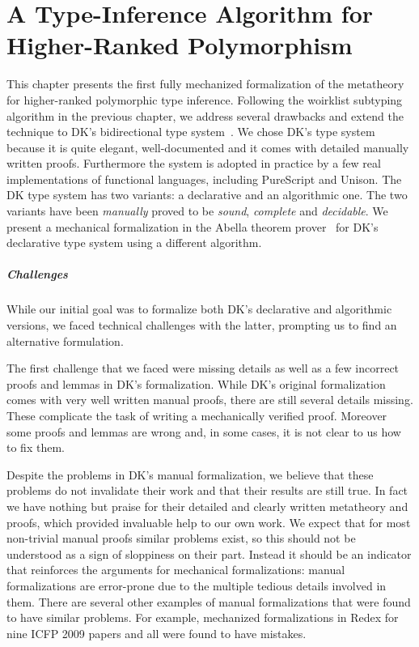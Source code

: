 \chapter{A Type-Inference Algorithm for Higher-Ranked Polymorphism}
\label{chap:ICFP}

This chapter presents the first fully mechanized formalization of the
metatheory for higher-ranked polymorphic type inference.
Following the woirklist subtyping algorithm in the previous chapter,
we address several drawbacks and extend the technique to
DK's bidirectional type system~\citep{dunfield2013complete}.
We chose DK's type system because it is
quite elegant, well-documented and it comes with detailed manually
written proofs. Furthermore the system is adopted in practice by a few
real implementations of functional languages, including PureScript and
Unison. The DK type system has two variants: a declarative
and an algorithmic one. The two variants have been
\emph{manually} proved to be \emph{sound}, \emph{complete} and
\emph{decidable}.
We present a mechanical formalization in the Abella theorem prover~\citep{AbellaDesc} for
DK's declarative type system using a different algorithm.

\paragraph{Challenges}
While our initial goal was to formalize both DK's declarative and algorithmic
versions, we faced technical challenges with the latter, prompting us to find
an alternative formulation.

The first challenge that we faced were missing details as well as
a few incorrect proofs and lemmas in DK's formalization. While DK's
original formalization comes with very well written manual proofs,
there are still several details missing. These complicate the task of
writing a mechanically verified proof. Moreover some proofs and
lemmas are wrong and, in some cases, it is not clear to us how to fix them.

Despite the problems in DK's manual formalization,
we believe that these problems do not
invalidate their work and that their results are still true.
In fact we have nothing but praise for their detailed
and clearly written metatheory and proofs, which provided invaluable
help to our own work.
We expect that for most non-trivial manual
proofs similar problems exist, so this should not be understood as a sign of sloppiness
on their part. Instead it should be an indicator that reinforces the arguments
for mechanical formalizations: manual formalizations are error-prone due to the multiple
tedious details involved in them.
There are several other examples of manual formalizations that were found to have
similar problems. For example, \citet{KleinRunYourResearch}
mechanized formalizations
in Redex for nine ICFP 2009 papers and all were found to have mistakes.

